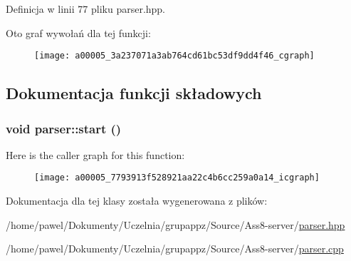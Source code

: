 Definicja w linii 77 pliku parser.hpp.

Oto graf wywołań dla tej funkcji:\nopagebreak
\begin{figure}[H]
\begin{center}
\leavevmode
\texttt{[image: a00005\_3a237071a3ab764cd61bc53df9dd4f46\_cgraph]}
\end{center}
\end{figure}


\subsection{Dokumentacja funkcji składowych}
\hypertarget{a00005_7793913f528921aa22c4b6cc259a0a14}{
\subsubsection[{start}]{\setlength{\rightskip}{0pt plus 5cm}void parser::start ()}}
\label{a00005_7793913f528921aa22c4b6cc259a0a14}




Here is the caller graph for this function:\nopagebreak
\begin{figure}[H]
\begin{center}
\leavevmode
\texttt{[image: a00005\_7793913f528921aa22c4b6cc259a0a14\_icgraph]}
\end{center}
\end{figure}


Dokumentacja dla tej klasy została wygenerowana z plików:\begin{CompactItemize}
\item 
/home/pawel/Dokumenty/Uczelnia/grupappz/Source/Ass8-server/\hyperlink{a00015}{parser.hpp}\item 
/home/pawel/Dokumenty/Uczelnia/grupappz/Source/Ass8-server/\hyperlink{a00014}{parser.cpp}\end{CompactItemize}
